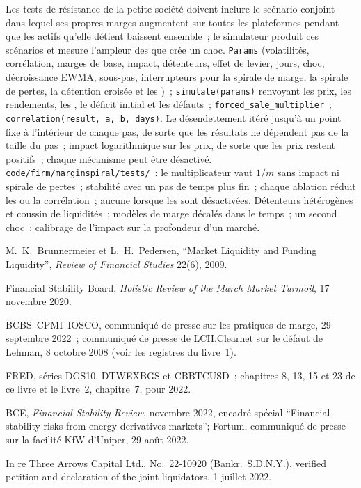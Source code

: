 \begin{build}
 Les tests de résistance de la petite société doivent inclure le scénario conjoint dans lequel ses propres marges augmentent sur toutes les plateformes pendant que les actifs qu'elle détient baissent
ensemble~; le simulateur produit ces scénarios et mesure l'ampleur des  que crée un choc.
 \texttt{Params} (volatilités, corrélation, marges de base, impact, détenteurs, effet de levier, jours, choc, décroissance EWMA, sous-pas, interrupteurs pour la
spirale de marge, la spirale de pertes, la détention croisée et les )~; \texttt{simulate(params)} renvoyant les prix, les rendements, les , le déficit initial et
les défauts~; \texttt{forced\_sale\_multiplier}~; \texttt{correlation(result, a, b, days)}.
 Le désendettement itéré jusqu'à un point fixe à l'intérieur de chaque pas, de sorte que les résultats ne dépendent pas de la taille du pas~; impact logarithmique sur les prix, de sorte que les prix restent
positifs~; chaque mécanisme peut être désactivé.
 \texttt{code/firm/marginspiral/tests/}~: le multiplicateur vaut $1/m$ sans impact ni spirale de pertes~; stabilité avec un pas de temps plus fin~;
chaque ablation réduit les  ou la corrélation~; aucune  lorsque les  sont désactivées.
 Détenteurs hétérogènes et coussin de liquidités~; modèles de marge décalés dans le temps~; un second choc~; calibrage de l'impact sur la profondeur d'un marché.
\end{build}

\begin{omsources}
\item M.~K.~Brunnermeier et L.~H.~Pedersen, ``Market Liquidity and Funding Liquidity'', \emph{Review of Financial Studies} 22(6), 2009.
\item Financial Stability Board, \emph{Holistic Review of the March Market Turmoil}, 17 novembre 2020.
\item BCBS--CPMI--IOSCO, communiqué de presse sur les pratiques de marge, 29 septembre 2022~; communiqué de presse de LCH.Clearnet sur le défaut de Lehman, 8 octobre 2008 (voir les registres du
livre~1).
\item FRED, séries DGS10, DTWEXBGS et CBBTCUSD~; chapitres 8, 13, 15 et 23 de ce livre et le livre~2, chapitre~7, pour 2022.
\item BCE, \emph{Financial Stability Review}, novembre 2022, encadré spécial ``Financial stability risks from energy derivatives markets''; Fortum, communiqué de
presse sur la facilité KfW d'Uniper, 29 août 2022.
\item In re Three Arrows Capital Ltd., No.\ 22-10920 (Bankr.\ S.D.N.Y.), verified petition and declaration of the joint liquidators, 1 juillet 2022.
\end{omsources}

